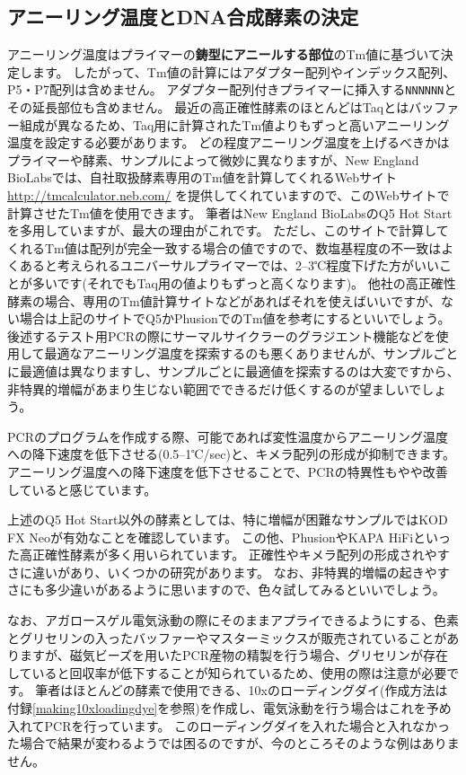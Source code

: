 \documentclass[titlepage,10pt,a4paper,uplatex]{jsbook}
\renewcommand{\textbf}[1]{{\bfseries\sffamily#1}}
\begin{document}
\subsection{アニーリング温度とDNA合成酵素の決定}

アニーリング温度はプライマーの\textbf{鋳型にアニールする部位}のTm値に基づいて決定します。
したがって、Tm値の計算にはアダプター配列やインデックス配列、P5・P7配列は含めません。
アダプター配列付きプライマーに挿入する\texttt{NNNNNN}とその延長部位も含めません。
最近の高正確性酵素のほとんどはTaqとはバッファー組成が異なるため、Taq用に計算されたTm値よりもずっと高いアニーリング温度を設定する必要があります。
どの程度アニーリング温度を上げるべきかはプライマーや酵素、サンプルによって微妙に異なりますが、New England BioLabsでは、自社取扱酵素専用のTm値を計算してくれるWebサイト \url{http://tmcalculator.neb.com/} を提供してくれていますので、このWebサイトで計算させたTm値を使用できます。
筆者はNew England BioLabsのQ5 Hot Startを多用していますが、最大の理由がこれです。
ただし、このサイトで計算してくれるTm値は配列が完全一致する場合の値ですので、数塩基程度の不一致はよくあると考えられるユニバーサルプライマーでは、2--3℃程度下げた方がいいことが多いです(それでもTaq用の値よりもずっと高くなります)。
他社の高正確性酵素の場合、専用のTm値計算サイトなどがあればそれを使えばいいですが、ない場合は上記のサイトでQ5かPhusionでのTm値を参考にするといいでしょう。
後述するテスト用PCRの際にサーマルサイクラーのグラジエント機能などを使用して最適なアニーリング温度を探索するのも悪くありませんが、サンプルごとに最適値は異なりますし、サンプルごとに最適値を探索するのは大変ですから、非特異的増幅があまり生じない範囲でできるだけ低くするのが望ましいでしょう。

PCRのプログラムを作成する際、可能であれば変性温度からアニーリング温度への降下速度を低下させる(0.5--1℃/sec)と、キメラ配列の形成が抑制できます\citep{Stevens2013}。
アニーリング温度への降下速度を低下させることで、PCRの特異性もやや改善していると感じています。

上述のQ5 Hot Start以外の酵素としては、特に増幅が困難なサンプルではKOD FX Neoが有効なことを確認しています。
この他、PhusionやKAPA HiFiといった高正確性酵素が多く用いられています。
正確性やキメラ配列の形成されやすさに違いがあり、いくつかの研究があります\citep{Potapov2017,Sze2019}。
なお、非特異的増幅の起きやすさにも多少違いがあるように思いますので、色々試してみるといいでしょう。

なお、アガロースゲル電気泳動の際にそのままアプライできるようにする、色素とグリセリンの入ったバッファーやマスターミックスが販売されていることがありますが、磁気ビーズを用いたPCR産物の精製を行う場合、グリセリンが存在していると回収率が低下することが知られているため、使用の際は注意が必要です。
筆者はほとんどの酵素で使用できる、10xのローディングダイ(作成方法は付録\ref{making10xloadingdye}を参照)を作成し、電気泳動を行う場合はこれを予め入れてPCRを行っています。
このローディングダイを入れた場合と入れなかった場合で結果が変わるようでは困るのですが、今のところそのような例はありません。
\end{document}

